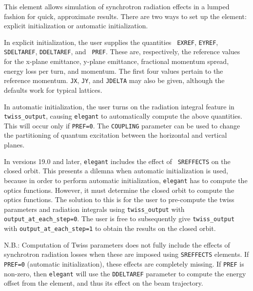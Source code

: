 This element allows simulation of synchrotron radiation effects in a
lumped fashion for quick, approximate results.  There are two ways to
set up the element: explicit initialization or automatic
initialization.  

In explicit initialization, the user supplies the quantities {\tt
EXREF}, {\tt EYREF}, {\tt SDELTAREF}, {\tt DDELTAREF}, and {\tt
PREF}.  These are, respectively, the reference values for the x-plane
emittance, y-plane emittance, fractional momentum spread, energy loss
per turn, and momentum.  The first four values pertain to the
reference momentum.  {\tt JX}, {\tt JY}, and {\tt JDELTA} may also
be given, although the defaults work for typical lattices.

In automatic initialization, the user turns on the radiation integral
feature in {\tt twiss\_output}, causing {\tt elegant} to automatically
compute the above quantities.  This will occur only if {\tt PREF=0}.
The {\tt COUPLING} parameter can be used to change the partitioning of
quantum excitation between the horizontal and vertical planes.

In versions 19.0 and later, {\tt elegant} includes the effect of {\tt
SREFFECTS} on the closed orbit.  This presents a dilemna when
automatic initialization is used, because in order to perform
automatic initialization, {\tt elegant} has to compute the optics
functions.  However, it must determine the closed orbit to compute the
optics functions.  The solution to this is for the user to pre-compute
the twiss parameters and radiation integrals using \verb|twiss_output|
with \verb|output_at_each_step=0|.  The user is free to subsequently give
\verb|twiss_output| with \verb|output_at_each_step=1| to obtain the
results on the closed orbit.

N.B.: Computation of Twiss parameters does not fully include the
effects of synchrotron radiation losses when these are imposed using
{\tt SREFFECTS} elements.  If {\tt PREF=0} (automatic initialization),
these effects are completely missing.  If {\tt PREF} is non-zero, then
{\tt elegant} will use the {\tt DDELTAREF} parameter to compute the
energy offset from the element, and thus its effect on the beam
trajectory.



